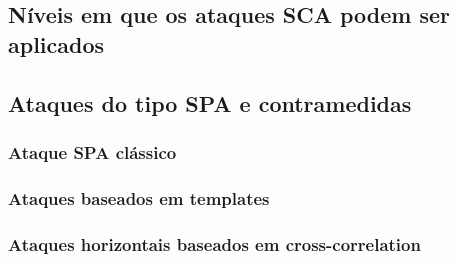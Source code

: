 \subsection{Níveis em que os ataques SCA podem ser aplicados}

\begin{comment}
\subsubsection{Operações na curva}
\subsubsection{Operações no protocolo criptográfico}
\subsubsection{Transferência da chave entre diferentes memórias}
\subsubsection{Protocolo em nível de aplicação}
\end{comment}





\subsection{Ataques do tipo SPA e contramedidas}

\subsubsection{Ataque SPA clássico}

\subsubsection{Ataques baseados em templates}

\subsubsection{Ataques horizontais baseados em cross-correlation}

